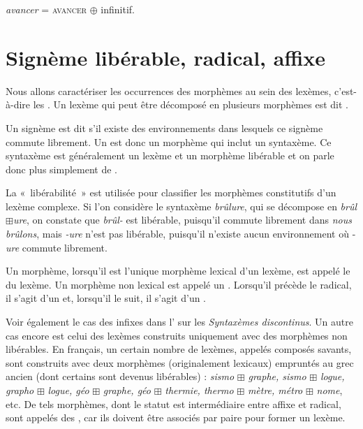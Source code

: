 \ea
\textit{avancer} = \textsc{avancer} ${\oplus}$ infinitif.
\z

\section{Signème libérable, radical, affixe}\label{sec:2.2.14}\largerpage

Nous allons caractériser les occurrences des morphèmes au sein des lexèmes, c’est-à-dire les . Un lexème qui peut être décomposé en plusieurs morphèmes est dit .

{Un signème est dit  s’il existe des environnements dans lesquels ce signème commute librement. Un  est donc un morphème qui inclut un syntaxème. Ce syntaxème est généralement un lexème et un morphème libérable et on parle donc plus simplement de .}

La «~libérabilité~» est utilisée pour classifier les morphèmes constitutifs d’un lexème complexe. Si l’on considère le syntaxème \textit{brûlure}, qui se décompose en \textit{brûl}${\boxplus}$\textit{ure}, on constate que \textit{brûl-} est libérable, puisqu’il commute librement dans \textit{nous brûlons}, mais \textit{{}-ure} n’est pas libérable, puisqu’il n’existe aucun environnement où -\textit{ure} commute librement.

{Un morphème, lorsqu’il est l’unique morphème lexical d’un lexème, est appelé le  du lexème. Un morphème non lexical est appelé un . Lorsqu’il précède le radical, il s’agit d’un  et, lorsqu’il le suit, il s'agit d’un .}

Voir également le cas des infixes dans l' sur les \textit{{Syntaxèmes discontinus}}.
Un autre cas encore est celui des lexèmes construits uniquement avec des morphèmes non libérables. En français, un certain nombre de lexèmes, appelés composés savants, sont construits avec deux morphèmes (originalement lexicaux) empruntés au grec ancien (dont certains sont devenus libérables) : \textit{sismo} ${\boxplus}$ \textit{graphe, sismo} ${\boxplus}$ \textit{logue, grapho} ${\boxplus}$ \textit{logue, géo} ${\boxplus}$ \textit{graphe, géo} ${\boxplus}$ \textit{thermie, thermo} ${\boxplus}$ \textit{mètre, métro} ${\boxplus}$ \textit{nome}, etc. De tels morphèmes, dont le statut est intermédiaire entre affixe et radical, sont appelés des , car ils doivent être associés par paire pour former un lexème.


